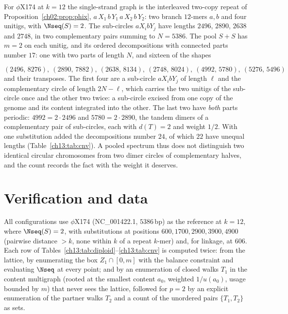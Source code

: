 \begin{sloppypar}
For $\phi$X174 at $k=12$ the single-strand graph is the interleaved two-copy repeat of
Proposition~\ref{ch02:prop:phix}, $a\,X_1\,b\,Y_1\,a\,X_2\,b\,Y_2$: two branch $12$-mers $a,b$ and four unitigs,
with $\Nseq(S)=2$. The sub-circles $aX_ibY_j$ have lengths $2496$, $2890$, $2638$ and $2748$,
in two complementary pairs summing to $N=5386$. The pool $S+S$ has $m=2$ on each unitig, and
its ordered decompositions with connected parts number $17$: one with two parts of length $N$,
and sixteen of the shapes
\end{sloppypar}
\[
  (2496,\,8276),\ (2890,\,7882),\ (2638,\,8134),\ (2748,\,8024),\ (4992,\,5780),\ (5276,\,5496)
\]
and their transposes. The first four are a sub-circle $aX_ibY_j$ of length $\ell$ and the complementary circle of
length $2N-\ell$, which carries the two unitigs of the sub-circle once and the other two
twice: a sub-circle excised from one copy of the genome and its content integrated into the
other. The last two
have \emph{both} parts periodic: $4992=2\cdot2496$ and $5780=2\cdot2890$, the tandem dimers of
a complementary pair of sub-circles, each with $d(T)=2$ and weight $1/2$. With one substitution
added the decompositions number $24$, of which $22$ have unequal lengths
(Table~\ref{ch13:tab:cnv}). A pooled spectrum thus does not distinguish two identical circular
chromosomes from two dimer circles of complementary halves, and the count records the fact
with the weight it deserves.

\section{Verification and data}\label{ch13:sec:data}

All configurations use $\phi$X174 (NC\_001422.1, $5386$\,bp) as the reference at $k=12$, where
$\Nseq(S)=2$, with substitutions at positions $600,1700,2900,3900,4900$ (pairwise distance
$>k$, none within $k$ of a repeat $k$-mer) and, for linkage, at $606$. Each row of
Tables~\ref{ch13:tab:diploid}--\ref{ch13:tab:cnv} is computed twice: from the lattice, by enumerating the
box $Z_1\cap[0,m]$ with the balance constraint and evaluating $\Nseq$ at every point; and by an
enumeration of closed walks $T_1$ in the content multigraph (rooted at the smallest content
$a_0$, weighted $1/u(a_0)$, usage bounded by $m$) that never sees the lattice, followed for
$p=2$ by an explicit enumeration of the partner walks $T_2$ and a count of the unordered pairs
$\{T_1,T_2\}$ as sets.

